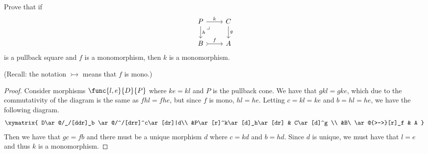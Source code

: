 \documentclass[main.tex]{subfiles}
\begin{document}
\paragraph{}
\begin{exercise}
	Prove that if
	\[\begin{tikzcd}
			P \ar[r, "k"] \ar[d, "h"]
			\ar[dr, phantom, "\lrcorner", very near start] & C\ar[d, "g"] \\
			B \ar[r, rightarrowtail, "f"] & A
	\end{tikzcd}\]
	is a pullback square and $f$ is a monomorphism, then $k$ is a monomorphism.
\end{exercise}
(Recall: the notation $\rightarrowtail$ means that $f$ is mono.)
\begin{proof}
	Consider morphisms $\func{l,e}{D}{P}$ where $ke=kl$ and $P$ is the pullback
	cone. We have that $gkl = gke$, which due to the commutativity of the diagram
	is the same as $fhl = fhe$, but since $f$ is mono, $hl=he$. Letting
	$c=kl=ke$ and $b=hl=he$, we have the following diagram.
	\[\xymatrix{
		D\ar@/_/[ddr]_b \ar@/^/[drr]^c\ar[dr]|d\\
		&P\ar[r]^k\ar[d]_h\ar[dr] & C\ar[d]^g \\
		&B\ \ar@{>->}[r]_f & A
	}\]
	Then we have that $gc=fb$ and there must be a unique morphism $d$ where
	$c=kd$ and $b=hd$. Since $d$ is unique, we must have that $l=e$ and thus $k$
	is a monomorphism.
\end{proof}
\end{document}
